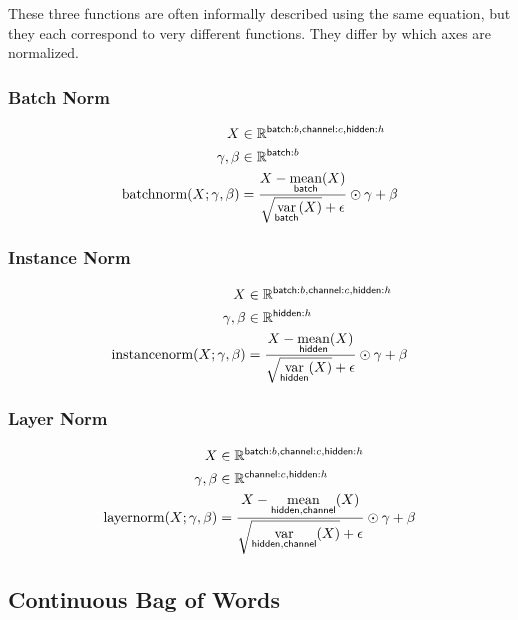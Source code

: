 \documentclass{article}
\newcommand{\name}[1]{\mathsf{#1}}
\newcommand{\nfun}[2]{\mathop{\text{#2}}\displaylimits_{\name{#1}}}
\newcommand{\reals}{\mathbb{R}}
\begin{document}
These three functions are often informally described using the same
equation, but they each correspond to very different functions. They differ
by which axes are normalized.

\subsubsection*{Batch Norm}

\begin{align*} 
X &\in \reals^{{\name{batch}:b, \name{channel}:c, \name{hidden}:h}}\\
\gamma, \beta &\in \reals^{{\name{batch}:b}} \\
\text{batchnorm}(X; \gamma, \beta) &= \frac{\displaystyle  X - \nfun{batch}{mean}(X)}{\displaystyle \sqrt{\nfun{batch}{var}(X)} + \epsilon } \odot \gamma + \beta
\end{align*}


\subsubsection*{Instance Norm}

\begin{align*} 
X &\in \reals^{{\name{batch}:b, \name{channel}:c, \name{hidden}:h}}\\
\gamma, \beta &\in \reals^{{\name{hidden}:h}} \\
\text{instancenorm}(X; \gamma, \beta) &= \frac{\displaystyle  X - \nfun{hidden}{mean}(X)}{\displaystyle  \sqrt{\nfun{hidden}{var}(X)} + \epsilon } \odot \gamma + \beta
\end{align*}

\subsubsection*{Layer Norm}

\begin{align*} 
X &\in \reals^{{\name{batch}:b, \name{channel}:c, \name{hidden}:h}} \\
\gamma, \beta &\in \reals^{{\name{channel}:c, \name{hidden}:h}} \\
\text{layernorm}(X; \gamma, \beta) &= \frac{\displaystyle X - \nfun{hidden,channel}{mean}(X)}{ \displaystyle  \sqrt{\nfun{hidden, channel}{var}(X)} + \epsilon } \odot \gamma + \beta 
\end{align*}


\subsection{Continuous Bag of Words}
\end{document}
